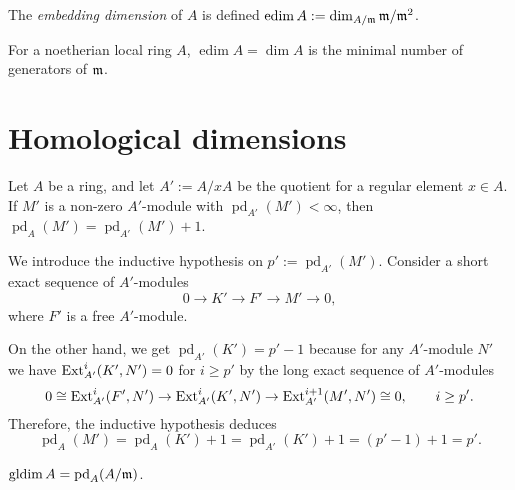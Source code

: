 \documentclass{../../large}
\renewcommand{\pd}{\operatorname{pd}}
\newcommand{\edim}{\operatorname{edim}}
\newcommand{\gldim}{\operatorname{gldim}}
\begin{document}
\begin{prb}
\end{prb}

\begin{prb}
\end{prb}



\begin{prb}
The \emph{embedding dimension} of $A$ is defined $\edim A:=\dim_{A/\fm}\fm/\fm^2$.

For a noetherian local ring $A$, $\edim A=\dim A$ is the minimal number of generators of $\mathfrak{m}$.
\end{prb}



\chapter{Homological dimensions}




\begin{prb}
Let $A$ be a ring, and let $A':=A/xA$ be the quotient for a regular element $x\in A$.
If $M'$ is a non-zero $A'$-module with $\pd_{A'}(M')<\infty$, then $\pd_A(M')=\pd_{A'}(M')+1$.
\end{prb}
\begin{pf}
We introduce the inductive hypothesis on $p':=\pd_{A'}(M')$.
Consider a short exact sequence of $A'$-modules
\[0\to K'\to F'\to M'\to0,\]
where $F'$ is a free $A'$-module.


On the other hand, we get $\pd_{A'}(K')=p'-1$ because for any $A'$-module $N'$ we have $\operatorname{Ext}_{A'}^i(K',N')=0$ for $i\ge p'$ by the long exact sequence of $A'$-modules
\[0\cong\operatorname{Ext}_{A'}^i(F',N')\to\operatorname{Ext}_{A'}^i(K',N')\to\operatorname{Ext}_{A'}^{i+1}(M',N')\cong0,\qquad i\ge p'.\]
Therefore, the inductive hypothesis deduces
\[\pd_A(M')=\pd_A(K')+1=\pd_{A'}(K')+1=(p'-1)+1=p'.\]
\end{pf}

$\gldim A=\pd_A(A/\fm)$.
\end{document}
